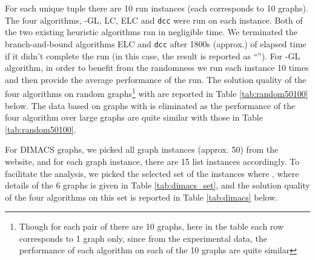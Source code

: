 \documentclass[10pt]{article}
\begin{document}
For each unique 
tuple there are 10 run instances (each  corresponds to 10 graphs). The four algorithms, -GL, LC, ELC and \texttt{dcc} were run on each instance.  
Both of the two existing heuristic algorithms ran in negligible time. We terminated the branch-and-bound algorithms ELC
and \texttt{dcc} after 1800s (approx.) of elapsed time if it didn't complete the run (in this case, the result is reported as ``'').  
For -GL algorithm, in order to benefit from the randomness we run each instance 10 times and then provide the average performance of the run. 
The solution quality of the four algorithms on random graphs\footnote{Though for each pair of  there are 10 graphs, here in the table each 
row corresponds to 1 graph only, since from the experimental data, the performance of each algorithm on each of the 10 graphs are quite similar} with  are reported in Table \ref{tab:random50100} below. The data based on graphs with  is eliminated as the performance of the four algorithm over large graphs are quite similar with those in Table \ref{tab:random50100}. 

For DIMACS\cite{dimacs} graphs, we picked all graph instances (approx. 50) from the website, and for each graph instance, there are 15 list instances accordingly.
To facilitate the analysis, we picked the selected set of the instances where , where details of the 6 graphs is given in Table \ref{tab:dimacs_set}, and the solution quality of the four algorithms on this set
is reported in Table \ref{tab:dimacs} below. 
\end{document}
